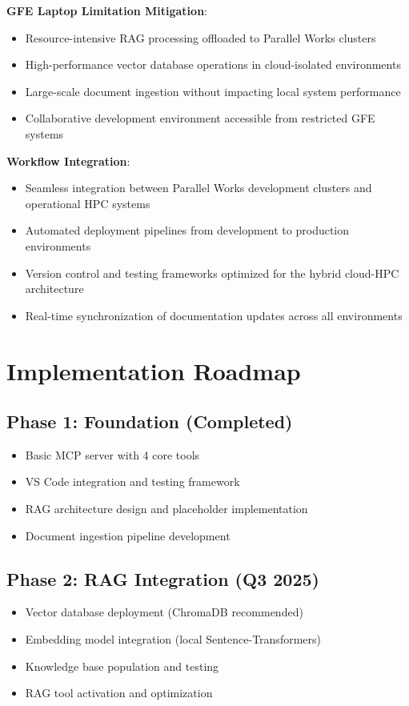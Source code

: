 \documentclass[11pt,letterpaper]{article}
\begin{document}
\textbf{GFE Laptop Limitation Mitigation}:
\begin{itemize}
    \item Resource-intensive RAG processing offloaded to Parallel Works clusters
    \item High-performance vector database operations in cloud-isolated environments
    \item Large-scale document ingestion without impacting local system performance
    \item Collaborative development environment accessible from restricted GFE systems
\end{itemize}

\textbf{Workflow Integration}:
\begin{itemize}
    \item Seamless integration between Parallel Works development clusters and operational HPC systems
    \item Automated deployment pipelines from development to production environments
    \item Version control and testing frameworks optimized for the hybrid cloud-HPC architecture
    \item Real-time synchronization of documentation updates across all environments
\end{itemize}

\section{Implementation Roadmap}

\subsection{Phase 1: Foundation (Completed)}
\begin{itemize}[leftmargin=20pt]
    \item[\color{noaaBlue}$\checkmark$] Basic MCP server with 4 core tools
    \item[\color{noaaBlue}$\checkmark$] VS Code integration and testing framework
    \item[\color{noaaBlue}$\checkmark$] RAG architecture design and placeholder implementation
    \item[\color{noaaBlue}$\checkmark$] Document ingestion pipeline development
\end{itemize}

\subsection{Phase 2: RAG Integration (Q3 2025)}
\begin{itemize}[leftmargin=20pt]
    \item Vector database deployment (ChromaDB recommended)
    \item Embedding model integration (local Sentence-Transformers)
    \item Knowledge base population and testing
    \item RAG tool activation and optimization
\end{itemize}
\end{document}
